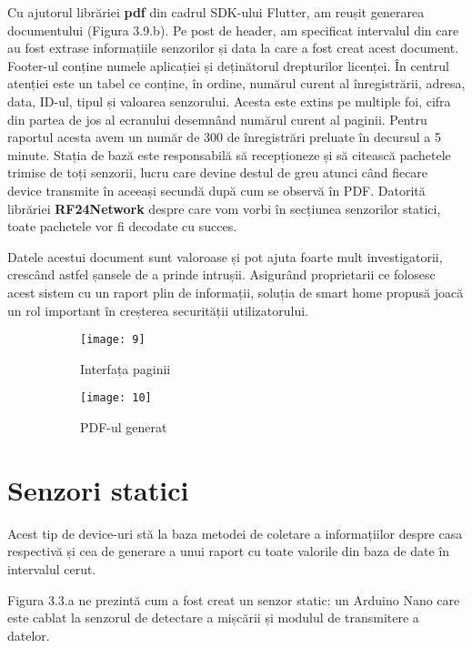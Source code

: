 Cu ajutorul librăriei \textbf{pdf} din cadrul SDK-ului Flutter, am reușit generarea documentului (Figura 3.9.b). Pe post de header, am specificat intervalul din care au fost extrase informațiile senzorilor și data la care a fost creat acest document. Footer-ul conține numele aplicației și deținătorul drepturilor licenței. În centrul atenției este un tabel ce conține, în ordine, numărul curent al înregistrării, adresa, data, ID-ul, tipul și valoarea senzorului. Acesta este extins pe multiple foi, cifra din partea de jos al ecranului desemnând numărul curent al paginii. Pentru raportul acesta avem un număr de 300 de înregistrări preluate în decursul a 5 minute. Stația de bază este responsabilă să recepționeze și să citească pachetele trimise de toți senzorii, lucru care devine destul de greu atunci când fiecare device transmite în aceeași secundă după cum se observă în PDF. Datorită librăriei \textbf{RF24Network} despre care vom vorbi în secțiunea senzorilor statici, toate pachetele vor fi decodate cu succes.

Datele acestui document sunt valoroase și pot ajuta foarte mult investigatorii, crescând astfel șansele de a prinde intrușii. Asigurând proprietarii ce folosesc acest sistem cu un raport plin de informații, soluția de smart home propusă joacă un rol important în creșterea securității utilizatorului.

\begin{figure}[h]
	\centering
	\begin{subfigure}{0.43\textwidth}
		\centering
		\texttt{[image: 9]}
		\caption{Interfața paginii}
		\label{fig:9}
	\end{subfigure}
	\hfill
	\begin{subfigure}{0.43\textwidth}
		\centering
		\texttt{[image: 10]}
		\caption{PDF-ul generat}
		\label{fig:10}
	\end{subfigure}
	\caption{}
	\label{fig:all4}
\end{figure}
\break

\section{Senzori statici}

Acest tip de device-uri stă la baza metodei de coletare a informațiilor despre casa respectivă și cea de generare a unui raport cu toate valorile din baza de date în intervalul cerut.

Figura 3.3.a ne prezintă cum a fost creat un senzor static: un Arduino Nano care este cablat la senzorul de detectare a mișcării și modulul de transmitere a datelor. 

